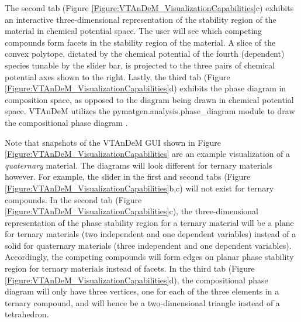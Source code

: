\documentclass[%
 reprint,
 amsmath,amssymb,
 aps,
]{revtex4-1}
\begin{document}
The second tab (Figure \ref{Figure:VTAnDeM_VisualizationCapabilities}c) exhibits an interactive three-dimensional representation of the stability region of the material in chemical potential space. The user will see which competing compounds form facets in the stability region of the material. A slice of the convex polytope, dictated by the chemical potential of the fourth (dependent) species tunable by the slider bar, is projected to the three pairs of chemical potential axes shown to the right. Lastly, the third tab (Figure \ref{Figure:VTAnDeM_VisualizationCapabilities}d) exhibits the phase diagram in composition space, as opposed to the diagram being drawn in chemical potential space. VTAnDeM utilizes the pymatgen.analysis.phase\_diagram module to draw the compositional phase diagram \cite{2013_Ong}.



Note that snapshots of the VTAnDeM GUI shown in Figure \ref{Figure:VTAnDeM_VisualizationCapabilities} are an example visualization of a \textit{quaternary} material. The diagrams will look different for ternary materials however. For example, the slider in the first and second tabs (Figure \ref{Figure:VTAnDeM_VisualizationCapabilities}b,c) will not exist for ternary compounds. In the second tab (Figure \ref{Figure:VTAnDeM_VisualizationCapabilities}c), the three-dimensional representation of the phase stability region for a ternary material will be a plane for ternary materials (two independent and one dependent variables) instead of a solid for quaternary materials (three independent and one dependent variables). Accordingly, the competing compounds will form edges on planar phase stability region for ternary materials instead of facets. In the third tab (Figure \ref{Figure:VTAnDeM_VisualizationCapabilities}d), the compositional phase diagram will only have three vertices, one for each of the three elements in a ternary compound, and will hence be a two-dimensional triangle instead of a tetrahedron.
\end{document}
